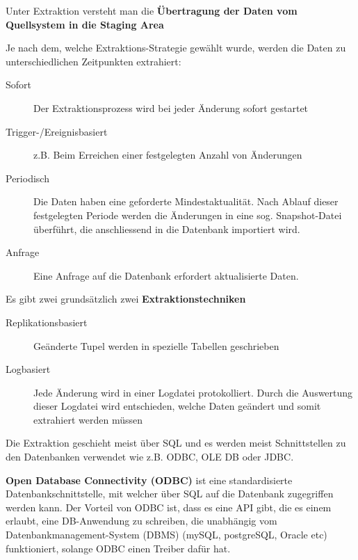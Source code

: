 \documentclass[a4paper, 11pt, nofootinbib]{article}
\begin{document}
Unter Extraktion versteht man die \textbf{Übertragung der Daten vom Quellsystem in die Staging Area}

\vspace{10px}

\noindent Je nach dem, welche Extraktions-Strategie gewählt wurde, werden die Daten zu unterschiedlichen Zeitpunkten extrahiert:

\begin{description}
	\item[Sofort] Der Extraktionsprozess wird bei jeder Änderung sofort gestartet
	\item[Trigger-/Ereignisbasiert] z.B. Beim Erreichen einer festgelegten Anzahl von Änderungen
	\item[Periodisch] Die Daten haben eine geforderte Mindestaktualität. Nach Ablauf dieser festgelegten Periode werden die Änderungen in eine sog. Snapshot-Datei überführt, die anschliessend in die Datenbank importiert wird.
	\item[Anfrage] Eine Anfrage auf die Datenbank erfordert aktualisierte Daten.
\end{description}

\vspace{10px}

\noindent Es gibt zwei grundsätzlich zwei \textbf{Extraktionstechniken}
\begin{description}
	\item[Replikationsbasiert] Geänderte Tupel werden in spezielle Tabellen geschrieben
	\item[Logbasiert] Jede Änderung wird in einer Logdatei protokolliert. Durch die Auswertung dieser Logdatei wird entschieden, welche Daten geändert und somit extrahiert werden müssen
\end{description}

\noindent Die Extraktion geschieht meist über SQL und es werden meist Schnittstellen zu den Datenbanken verwendet wie z.B. ODBC, OLE DB oder JDBC.

\vspace{10px}

\noindent \textbf{Open Database Connectivity (ODBC)} ist eine standardisierte Datenbankschnittstelle, mit welcher über SQL auf die Datenbank zugegriffen werden kann. Der Vorteil von ODBC ist, dass es eine API gibt, die es einem erlaubt, eine DB-Anwendung zu schreiben, die unabhängig vom Datenbankmanagement-System (DBMS) (mySQL, postgreSQL, Oracle etc) funktioniert, solange ODBC einen Treiber dafür hat.
\end{document}
